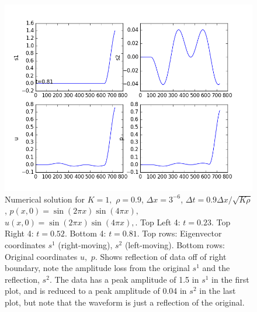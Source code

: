 \documentclass[12pt]{article}
\begin{document}
\begin{enumerate}[(a)]
\begin{figure}[H]
\centering\includegraphics[scale=0.4]{acoustic_eqn_frames/acoustic_eqn_fig15.png}
\caption{Numerical solution for $K=1,$ $\rho=0.9$, $\Delta x = 3^{-6}$, $\Delta t = 0.9 \Delta x / \sqrt{K \rho}$, $p(x,0) = \sin(2\pi x)\sin(4 \pi x),$
$u(x,0) = \sin(2\pi x)\sin(4 \pi x),$.  Top Left 4: $t=0.23$. Top Right 4: $t=0.52$. Bottom 4: $t=0.81$. Top rows: Eigenvector coordinates $s^1$ (right-moving), $s^2$ (left-moving).  Bottom rows: Original coordinates $u,$ $p$.  Shows reflection of data off of right boundary, note the amplitude loss from the original $s^1$ and the reflection, $s^2$.  The data has a peak amplitude of 1.5 in $s^1$ in the first plot, and is reduced to a peak amplitude of 0.04 in $s^2$ in the last plot, but note that the waveform is just a reflection of the original.}
\end{figure}
\begin{figure}[H]


\end{figure}
\end{enumerate}
\end{document}
